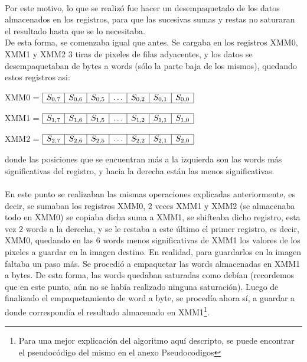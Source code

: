 \documentclass[11pt, a4paper]{article}
\begin{document}
\paragraph{}
Por este motivo, lo que se realiz\'o fue hacer un desempaquetado de los datos almacenados en los registros, para que las sucesivas sumas y restas no saturaran el resultado hasta que se lo necesitaba.\\
De esta forma, se comenzaba igual que antes. Se cargaba en los registros XMM0, XMM1 y XMM2 3 tiras de pixeles de filas adyacentes, y los datos se desempaquetaban de bytes a words (s\'olo la parte baja de los mismos), quedando estos registros asi:

\begin{center}
XMM0 = $\begin{array}{|c|c|c|c|c|c|c|}
\hline
S_{0,7} & S_{0,6} & S_{0,5} & \ldots & S_{0,2} & S_{0,1} & S_{0,0}\\
\hline
\end{array} $
\end{center}


\begin{center}
XMM1 = $\begin{array}{|c|c|c|c|c|c|c|}
\hline
S_{1,7} & S_{1,6} & S_{1,5} & \ldots & S_{1,2} & S_{1,1} & S_{1,0}\\
\hline
\end{array} $
\end{center}

\begin{center}
XMM2 = $\begin{array}{|c|c|c|c|c|c|c|}
\hline
S_{2,7} & S_{2,6} & S_{2,5} & \ldots & S_{2,2} & S_{2,1} & S_{2,0}\\
\hline
\end{array} $
\end{center}

donde las posiciones que se encuentran m\'as a la izquierda son las words m\'as significativas del registro, y hacia la derecha est\'an las menos significativas.

\paragraph{}
En este punto se realizaban las mismas operaciones explicadas anteriormente, es decir, se sumaban los registros XMM0, 2 veces XMM1 y XMM2 (se almacenaba todo en XMM0) se copiaba dicha suma a XMM1, se shifteaba dicho registro, esta vez 2 words a la derecha, y se le restaba a este \'ultimo el primer registro, es decir, XMM0, quedando en las 6 words menos significativas de XMM1 los valores de los pixeles a guardar en la imagen destino. En realidad, para guardarlos en la imagen faltaba un paso m\'as. Se procedi\'o a empaquetar las words almacenadas en XMM1 a bytes. De esta forma, las words quedaban saturadas como deb\'ian (recordemos que en este punto, a\'un no se hab\'ia realizado ninguna saturaci\'on). Luego de finalizado el empaquetamiento de word a byte, se proced\'ia ahora s\'i, a guardar a donde correspond\'ia el resultado almacenado en XMM1\footnote{Para una mejor explicaci\'on del algoritmo aqu\'i descripto, se puede encontrar el pseudoc\'odigo del mismo en el anexo Pseudocodigos}.
\end{document}

